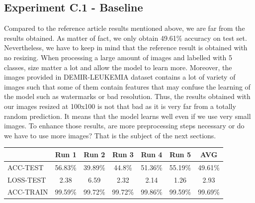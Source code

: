 \documentclass[11pt, openany]{report}
\theoremstyle{plain}
\theoremstyle{definition}
\theoremstyle{remark}
\begin{document}
\subsection{Experiment C.1 - Baseline}
Compared to the reference article \cite{leukemia} results mentioned above, we are far from the results obtained. As matter of fact, we only obtain 49.61\% accuracy on test set. Nevertheless, we have to keep in mind that the reference result is obtained with no resizing. When processing a large amount of images and labelled with 5 classes, size matter a lot and allow the model to learn more. Moreover, the images provided in DEMIR-LEUKEMIA dataset contains a lot of variety of images such that some of them contain features that may confuse the learning of the model such as watermarks or bad resolution. Thus, the results obtained with our images resized at 100x100 is not that bad as it is very far from a totally random prediction. It means that the model learns well even if we use very small images. To enhance those results, are more preprocessing steps necessary or do we have to use more images? That is the subject of the next sections.      

\begin{center}
\begin{tabular}{|l|c|c|c|c|c|c|}
  \hline
   & \textbf{Run 1} & \textbf{Run 2} & \textbf{Run 3} & \textbf{Run 4} & \textbf{Run 5} & \textbf{AVG}\\
  \hline
  ACC-TEST & 56.83\% & 39.89\% & 44.8\% & 51.36\% & 55.19\% & 49.61\% \\
  LOSS-TEST & 2.38 & 6.59 & 2.32 & 2.14  & 1.26 & 2.93 \\ 
  ACC-TRAIN & 99.59\% & 99.72\% & 99.72\% & 99.86\% & 99.59\% & 99.69\% \\ 
  \hline
\end{tabular}
\label{table:results-C1}
\end{center}
\end{document}
